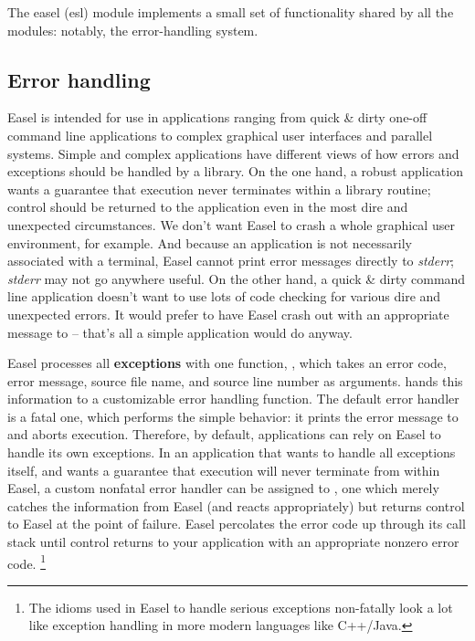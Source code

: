 The easel (esl) module implements a small set of functionality shared
by all the modules: notably, the error-handling system.

\subsection{Error handling}

Easel is intended for use in applications ranging from quick \& dirty
one-off command line applications to complex graphical user interfaces
and parallel systems. Simple and complex applications have different
views of how errors and exceptions should be handled by a library.  On
the one hand, a robust application wants a guarantee that execution
never terminates within a library routine; control should be returned
to the application even in the most dire and unexpected
circumstances. We don't want Easel to crash a whole graphical user
environment, for example. And because an application is not
necessarily associated with a terminal, Easel cannot print error
messages directly to \emph{stderr}; \emph{stderr} may not go anywhere
useful. On the other hand, a quick \& dirty command line application
doesn't want to use lots of code checking for various dire and
unexpected errors. It would prefer to have Easel crash out with an
appropriate message to  -- that's all a simple
application would do anyway.

Easel processes all \textbf{exceptions} with one function,
, which takes an error code, error message,
source file name, and source line number as arguments.
 hands this information to a customizable error
handling function. The default error handler is a fatal one, which
performs the simple behavior: it prints the error message to
 and aborts execution. Therefore, by default,
applications can rely on Easel to handle its own exceptions.  In an
application that wants to handle all exceptions itself, and wants a
guarantee that execution will never terminate from within Easel, a
custom nonfatal error handler can be assigned to ,
one which merely catches the information from Easel (and reacts
appropriately) but returns control to Easel at the point of
failure. Easel percolates the error code up through its call stack
until control returns to your application with an appropriate nonzero
error code. \footnote{The idioms used in Easel to handle serious
exceptions non-fatally look a lot like exception handling in more
modern languages like C++/Java.}

